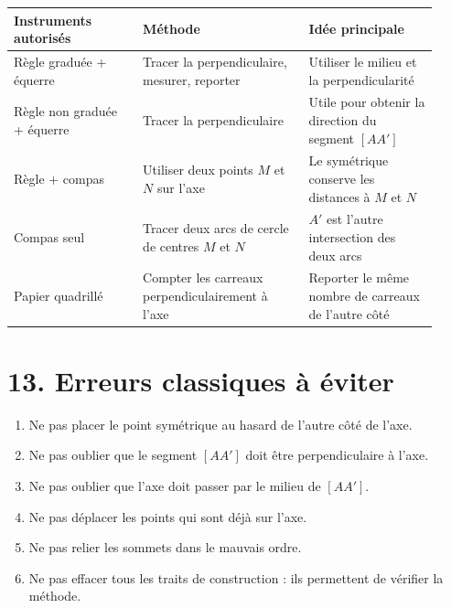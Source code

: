 \documentclass[11pt,a4paper]{article}
\begin{document}
\begin{center}
\renewcommand{\arraystretch}{1.4}
\begin{tabular}{|p{0.28\linewidth}|p{0.36\linewidth}|p{0.28\linewidth}|}
\hline
\textbf{Instruments autorisés} & \textbf{Méthode} & \textbf{Idée principale} \\
\hline
Règle graduée + équerre 
& Tracer la perpendiculaire, mesurer, reporter 
& Utiliser le milieu et la perpendicularité \\
\hline
Règle non graduée + équerre 
& Tracer la perpendiculaire 
& Utile pour obtenir la direction du segment $[AA']$ \\
\hline
Règle + compas 
& Utiliser deux points $M$ et $N$ sur l'axe 
& Le symétrique conserve les distances à $M$ et $N$ \\
\hline
Compas seul 
& Tracer deux arcs de cercle de centres $M$ et $N$ 
& $A'$ est l'autre intersection des deux arcs \\
\hline
Papier quadrillé 
& Compter les carreaux perpendiculairement à l'axe 
& Reporter le même nombre de carreaux de l'autre côté \\
\hline
\end{tabular}
\end{center}

\section*{13. Erreurs classiques à éviter}

\begin{attention}
\begin{enumerate}[label=\arabic*)]
    \item Ne pas placer le point symétrique au hasard de l'autre côté de l'axe.
    \item Ne pas oublier que le segment $[AA']$ doit être perpendiculaire à l'axe.
    \item Ne pas oublier que l'axe doit passer par le milieu de $[AA']$.
    \item Ne pas déplacer les points qui sont déjà sur l'axe.
    \item Ne pas relier les sommets dans le mauvais ordre.
    \item Ne pas effacer tous les traits de construction : ils permettent de vérifier la méthode.
\end{enumerate}
\end{attention}

\end{document}
